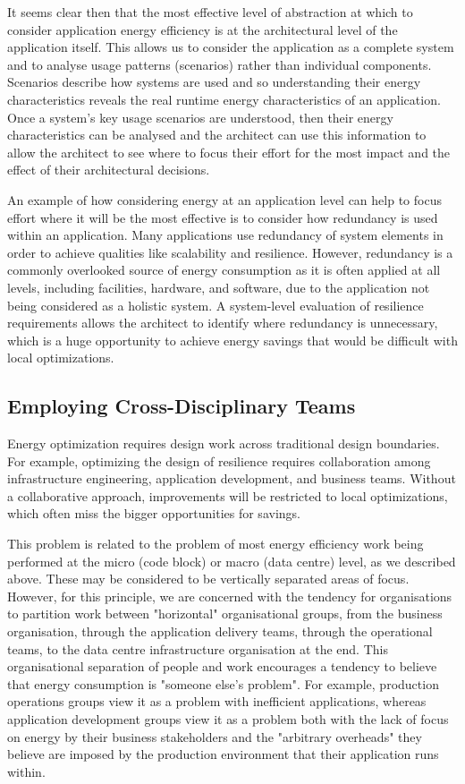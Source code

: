 It seems clear then that the most effective level of abstraction at which to consider application energy efficiency is at the architectural level of the application itself.  This allows us to consider the application as a complete system and to analyse usage patterns (scenarios) rather than individual components.  Scenarios describe how systems are used and so understanding their energy characteristics reveals the real runtime energy characteristics of an application.  Once a system's key usage scenarios are understood, then their energy characteristics can be analysed and the architect can use this information to allow the architect to see where to focus their effort for the most impact and the effect of their architectural decisions.

An example of how considering energy at an application level can help to focus effort where it will be the most effective is to consider how redundancy is used within an application.  Many applications use redundancy of system elements in order to achieve qualities like scalability and resilience.  However, redundancy is a commonly overlooked source of energy consumption as it is often applied at all levels, including facilities, hardware, and software, due to the application not being considered as a holistic system.   A system-level evaluation of resilience requirements allows the architect to identify where redundancy is unnecessary, which is a huge opportunity to achieve energy savings that would be difficult with local optimizations.

\subsection{Employing Cross-Disciplinary Teams}

Energy optimization requires design work across traditional design boundaries. For example, optimizing the design of resilience requires collaboration among infrastructure engineering, application development, and business teams. Without a collaborative approach, improvements will be restricted to local optimizations, which often miss the bigger opportunities for savings.

This problem is related to the problem of most energy efficiency work being performed at the micro (code block) or macro (data centre) level, as we described above.  These may be considered to be vertically separated areas of focus.  However, for this principle, we are concerned with the tendency for organisations to partition work between "horizontal" organisational groups, from the business organisation, through the application delivery teams, through the operational teams, to the data centre infrastructure organisation at the end.  This organisational separation of people and work encourages a tendency to believe that energy consumption is "someone else's problem".  For example, production operations groups view it as a problem with inefficient applications, whereas application development groups view it as a problem both with the lack of focus on energy by their business stakeholders and the "arbitrary overheads" they believe are imposed by the production environment that their application runs within.

